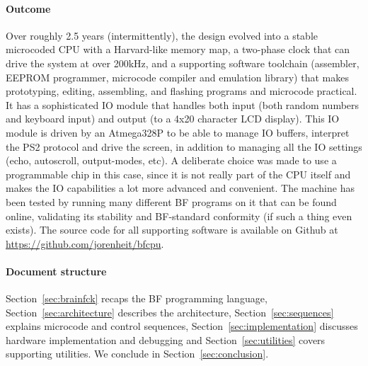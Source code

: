 \paragraph{Outcome}
Over roughly 2.5 years (intermittently), the design evolved into a stable microcoded CPU with a Harvard-like memory map, a two-phase clock that can drive the system at over 200kHz, and a supporting software toolchain (assembler, EEPROM programmer, microcode compiler and emulation library) that makes prototyping, editing, assembling, and flashing programs and microcode practical. It has a sophisticated IO module that handles both input (both random numbers and keyboard input) and output (to a 4x20 character LCD display). This IO module is driven by an Atmega328P to be able to manage IO buffers, interpret the PS2 protocol and drive the screen, in addition to managing all the IO settings (echo, autoscroll, output-modes, etc). A deliberate choice was made to use a programmable chip in this case, since it is not really part of the CPU itself and makes the IO capabilities a lot more advanced and convenient. The machine has been tested by running many different BF programs on it that can be found online, validating its stability and BF-standard conformity (if such a thing even exists). The source code for all supporting software is available on Github at \url{https://github.com/jorenheit/bfcpu}.

\paragraph{Document structure}
  Section~\ref{sec:brainfck} recaps the BF programming language, Section~\ref{sec:architecture} describes the architecture, Section~\ref{sec:sequences} explains microcode and control sequences, Section~\ref{sec:implementation} discusses hardware implementation and debugging and Section~\ref{sec:utilities} covers supporting utilities. We conclude in Section~\ref{sec:conclusion}. 
